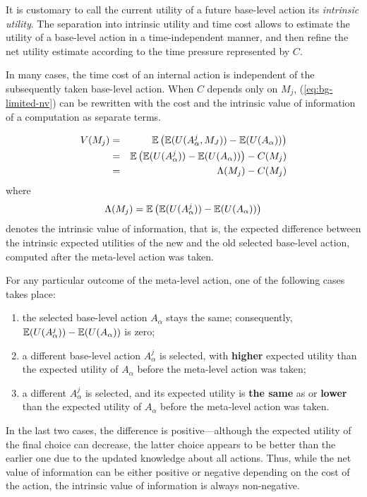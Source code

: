 It is customary to call the current utility of a future base-level
action its {\em intrinsic utility}. The separation into intrinsic
utility and time cost allows to estimate the utility of a base-level
action in a time-independent manner, and then refine the net utility
estimate according to the time pressure represented by $C$.

In many cases, the time cost of an internal action is independent of
the subsequently taken base-level action. When $C$ depends only on
$M_j$, (\ref{eq:bg-limited-nv}) can be rewritten with the cost and the
intrinsic value of information of a computation as separate terms.

\begin{eqnarray}
\label{eq:bg-limited-v=bc}
V(M_j)&=&\mathbb{E}\left(\mathbb{E}(U(A_\alpha^j, M_J))-\mathbb{E}(U(A_\alpha))\right)\nonumber\\
     &=&\mathbb{E}\left(\mathbb{E}(U(A_\alpha^j))-\mathbb{E}(U(A_\alpha))\right)-C(M_j)\\
     &=& \Lambda(M_j)-C(M_j)
\end{eqnarray}
where
\begin{equation}
\label{eq:bg-limited-benefit}
\Lambda(M_j)=\mathbb{E}\left(\mathbb{E}(U(A_\alpha^j))-\mathbb{E}(U(A_\alpha))\right)
\end{equation}
denotes the intrinsic value of information, that is, the expected
difference between the intrinsic expected utilities of the new
and the old selected base-level action, computed after the meta-level
action was taken.

For any particular outcome of the meta-level action, one of the
following cases takes place:

\begin{enumerate}
\item the selected base-level action $A_\alpha$ stays the same;
  consequently, $\mathbb{E}(U(A_\alpha^j))-\mathbb{E}(U(A_\alpha))$ is zero;
\item a different base-level action $A_\alpha^j$ is selected, with
  {\bf higher} expected utility than the expected utility of
  $A_\alpha$ before the meta-level action was taken;
\item a different $A_\alpha^j$ is selected, and its expected
  utility is {\bf the same} as or {\bf lower} than the expected
  utility of $A_\alpha$ before the meta-level action was taken.
\end{enumerate}

In the last two cases, the difference is positive---although the
expected utility of the final choice can decrease, the latter
choice appears to be better than the earlier one due
to the updated knowledge about all actions. Thus, while the
net value of information can be either positive or negative depending on
the cost of the action, the intrinsic value of information is always
non-negative.

